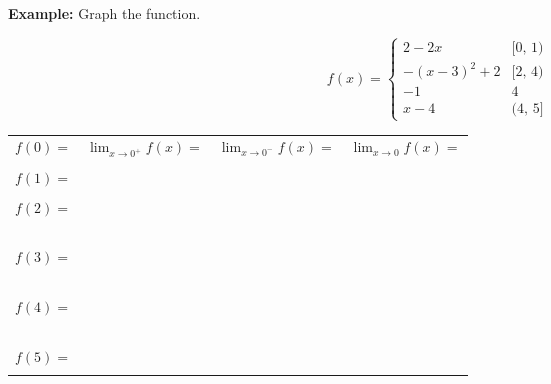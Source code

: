 \documentclass[addpoints, 12pt]{exam}
\begin{document}
\noindent\textbf{Example:} Graph the function.\\
\begin{minipage}{0.30\linewidth}
    \[f(x)=
        \begin{cases}
        2-2x        &   [0,\,1)\\
        -(x-3)^2+2  &   [2,\,4)\\
        -1          &   4\\
        x-4         &   (4,\,5]
        \end{cases}
    \]
\end{minipage}
\hfill
\begin{minipage}{0.65\linewidth}
    \begin{center}
    \end{center}
\end{minipage}

\begin{longtable}{|m{3.667cm}|m{3.667cm}|m{3.667cm}|m{3.7cm}|}
    \hline
    $\displaystyle f(0)=$   &   $\displaystyle\lim_{x\to0^+}f(x)=$  &   $\displaystyle\lim_{x\to0^-}f(x)=$  &   $\displaystyle\lim_{x\to0}f(x)=$ \\
                            &   &   &   \\\hline
    $\displaystyle f(1)=$   &   &   &   \\
                            &   &   &   \\\hline
    $\displaystyle f(2)=$   &   &   &   \\\
                            &   &   &   \\\hline
    $\displaystyle f(3)=$   &   &   &   \\\
                            &   &   &   \\\hline
    $\displaystyle f(4)=$   &   &   &   \\\
                            &   &   &   \\\hline
    $\displaystyle f(5)=$   &   &   &   \\
                            &   &   &   \\\hline
\end{longtable}

\newpage
\end{document}
